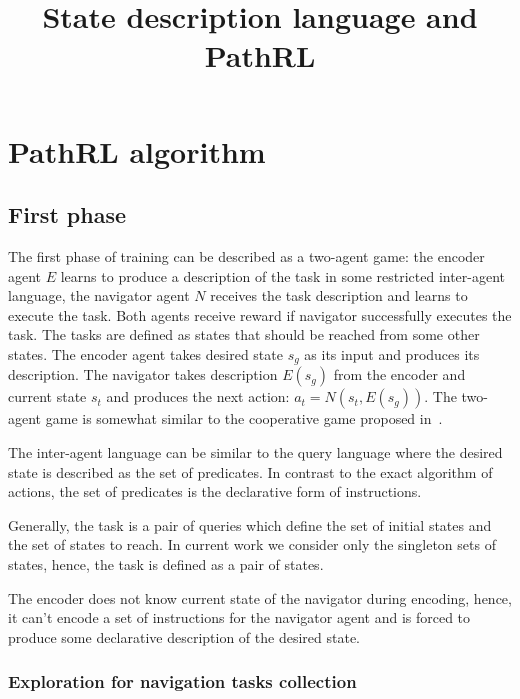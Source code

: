 \documentclass{article}
\title{State description language and PathRL}
\author{}
\date{}
\begin{document}
\maketitle

\section{PathRL algorithm}

\subsection{First phase}

The first phase of training can be described as a two-agent game: the encoder agent $E$ learns to produce a description of the task in some restricted inter-agent language, the navigator agent $N$ receives the task description and learns to execute the task. Both agents receive reward if navigator successfully executes the task. The tasks are defined as states that should be reached from some other states. The encoder agent takes desired state $s_g$ as its input and produces its description. The navigator takes description $E(s_g)$ from the encoder and current state $s_t$ and produces the next action: $a_t = N(s_t, E(s_g))$. The two-agent game is somewhat similar to the cooperative game proposed in~\citep{Mordatch2018EmergenceOG}.

The inter-agent language can be similar to the query language where the desired state is described as the set of predicates. In contrast to the exact algorithm of actions, the set of predicates is the declarative form of instructions.

Generally, the task is a pair of queries which define the set of initial states and the set of states to reach. In current work we consider only the singleton sets of states, hence, the task is defined as a pair of states.

The encoder does not know current state of the navigator during encoding, hence, it can't encode a set of instructions for the navigator agent and is forced to produce some declarative description of the desired state.

\subsubsection{Exploration for navigation tasks collection}
\end{document}
